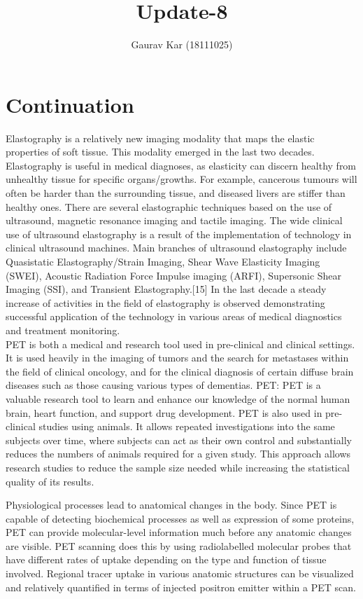 \documentclass{article}
\title{Update-8}
\author{Gaurav Kar (18111025)}
\date{}
\begin{document}
\maketitle

\section{Continuation}
Elastography is a relatively new imaging modality that maps the elastic properties of soft tissue. This modality emerged in the last two decades. Elastography is useful in medical diagnoses, as elasticity can discern healthy from unhealthy tissue for specific organs/growths. For example, cancerous tumours will often be harder than the surrounding tissue, and diseased livers are stiffer than healthy ones. There are several elastographic techniques based on the use of ultrasound, magnetic resonance imaging and tactile imaging. The wide clinical use of ultrasound elastography is a result of the implementation of technology in clinical ultrasound machines. Main branches of ultrasound elastography include Quasistatic Elastography/Strain Imaging, Shear Wave Elasticity Imaging (SWEI), Acoustic Radiation Force Impulse imaging (ARFI), Supersonic Shear Imaging (SSI), and Transient Elastography.[15] In the last decade a steady increase of activities in the field of elastography is observed demonstrating successful application of the technology in various areas of medical diagnostics and treatment monitoring.\\PET is both a medical and research tool used in pre-clinical and clinical settings. It is used heavily in the imaging of tumors and the search for metastases within the field of clinical oncology, and for the clinical diagnosis of certain diffuse brain diseases such as those causing various types of dementias. PET: PET is a valuable research tool to learn and enhance our knowledge of the normal human brain, heart function, and support drug development. PET is also used in pre-clinical studies using animals. It allows repeated investigations into the same subjects over time, where subjects can act as their own control and substantially reduces the numbers of animals required for a given study. This approach allows research studies to reduce the sample size needed while increasing the statistical quality of its results.

Physiological processes lead to anatomical changes in the body. Since PET is capable of detecting biochemical processes as well as expression of some proteins, PET can provide molecular-level information much before any anatomic changes are visible. PET scanning does this by using radiolabelled molecular probes that have different rates of uptake depending on the type and function of tissue involved. Regional tracer uptake in various anatomic structures can be visualized and relatively quantified in terms of injected positron emitter within a PET scan.
\end{document}
